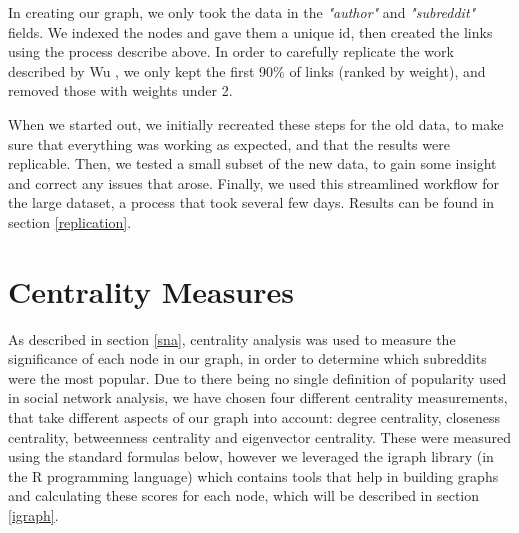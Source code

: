 \documentclass[bsc,frontabs,twoside,singlespacing,parskip,deptreport]{infthesis}
\begin{document}
In creating our graph, we only took the data in the \textit{"author"} and  \textit{"subreddit"} fields. We indexed the nodes and gave them a unique id, then created the links using the process describe above. In order to carefully replicate the work described by Wu \cite{masters}, we only kept the first 90\% of links (ranked by weight), and removed those with weights under 2.

When we started out, we initially recreated these steps for the old data, to make sure that everything was working as expected, and that the results were replicable. Then, we tested a small subset of the new data, to gain some insight and correct any issues that arose. Finally, we used this streamlined workflow for the large dataset, a process that took several few days. Results can be found in section \ref{replication}.

\section{Centrality Measures}\label{centrality}
As described in section \ref{sna}, centrality analysis was used to measure the significance of each node in our graph, in order to determine which subreddits were the most popular. Due to there being no single definition of popularity used in social network analysis, we have chosen four different centrality measurements, that take different aspects of our graph into account: degree centrality, closeness centrality, betweenness centrality and eigenvector centrality. These were measured using the standard formulas below, however we leveraged the igraph library (in the R programming language) which contains tools that help in building graphs and calculating these scores for each node, which will be described in section \ref{igraph}.
\end{document}
